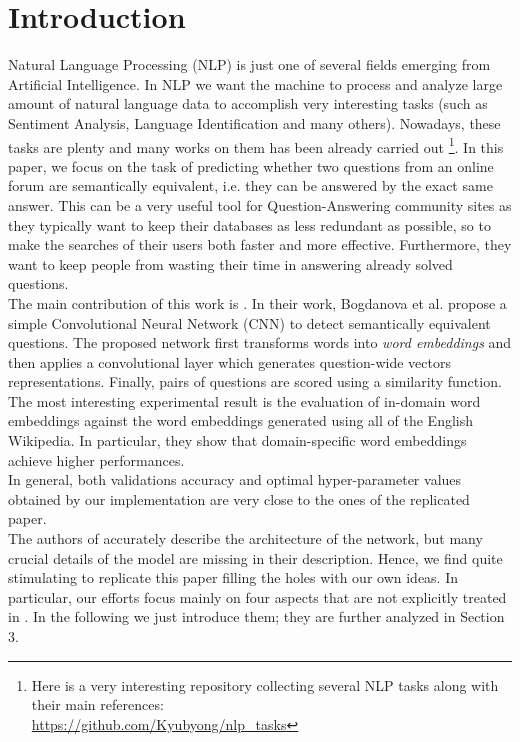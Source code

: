 \documentclass[10pt,twocolumn,letterpaper]{article}
\begin{document}
\section{Introduction}
Natural Language Processing (NLP) is just one of several fields emerging from Artificial Intelligence. In NLP we want the machine to process and analyze large amount of natural language data to accomplish very interesting tasks (such as Sentiment Analysis, Language Identification and many others). Nowadays, these tasks are plenty and many works on them has been already carried out \footnote{Here is a very interesting repository collecting several NLP tasks along with their main references: \\ \url{https://github.com/Kyubyong/nlp_tasks}}. In this paper, we focus on the task of predicting whether two questions from an online forum are semantically equivalent, i.e. they can be answered by the exact same answer. This can be a very useful tool for Question-Answering community sites as they typically want to keep their databases as less redundant as possible, so to make the searches of their users both faster and more effective. Furthermore, they want to keep people from wasting their time in answering already solved questions. \\
The main contribution of this work is \cite{bogdanova2015detecting}. In their work, Bogdanova et al. propose a simple Convolutional Neural Network (CNN) to detect semantically equivalent questions. The proposed network first transforms words into \emph{word embeddings} and then applies a convolutional layer which generates question-wide vectors representations. Finally, pairs of questions are scored using a similarity function. The most interesting experimental result is the evaluation of in-domain word embeddings against the word embeddings generated using all of the English Wikipedia. In particular, they show that domain-specific word embeddings achieve higher performances. \\
In general, both validations accuracy and optimal hyper-parameter values obtained by our implementation are very close to the ones of the replicated paper.\\
The authors of \cite{bogdanova2015detecting} accurately describe the architecture of the network, but many crucial details of the model are missing in their description. Hence, we find quite stimulating to replicate this paper filling the holes with our own ideas. In particular, our efforts focus mainly on four aspects that are not explicitly treated in \cite{bogdanova2015detecting}. In the following we just introduce them; they are further analyzed in Section 3.
\end{document}
